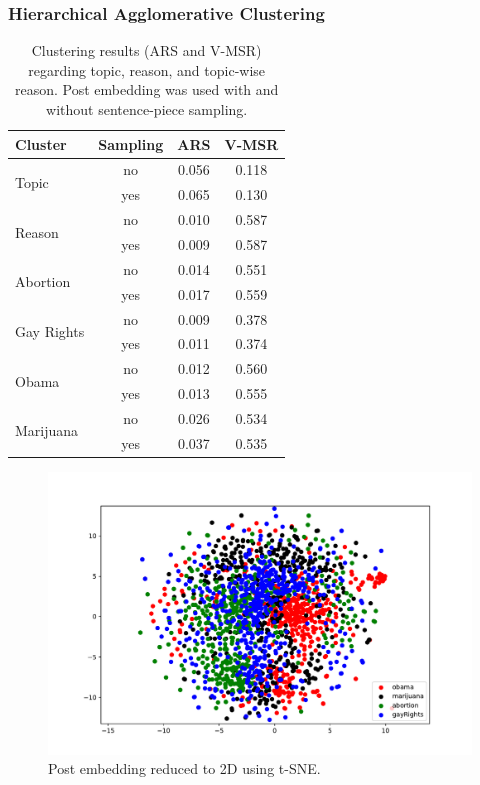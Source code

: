 \documentclass[11pt]{article}
\begin{document}
\subsubsection*{Hierarchical Agglomerative Clustering}

\begin{table}
  \centering
  \begin{tabular}{lccc}
    \toprule
    Cluster & Sampling & ARS & V-MSR \\
    \midrule
    \multirow{2}{*}{Topic} & no & 0.056 &  0.118 \\
    & yes & 0.065 & 0.130 \\[8pt]
    \multirow{2}{*}{Reason} & no & 0.010 &  0.587 \\
    & yes & 0.009 & 0.587 \\[8pt]
    \multirow{2}{*}{Abortion} & no  & 0.014 &  0.551 \\
    & yes & 0.017 & 0.559 \\[8pt]
    \multirow{2}{*}{Gay Rights} & no  & 0.009 &  0.378 \\
    & yes & 0.011 & 0.374 \\
    \multirow{2}{*}{Obama} & no & 0.012 &  0.560 \\
    & yes & 0.013 & 0.555 \\[8pt]
    \multirow{2}{*}{Marijuana} & no  & 0.026 &  0.534 \\
    & yes & 0.037 & 0.535 \\[8pt]
    \bottomrule
  \end{tabular}
  \caption{\label{table:2}Clustering results (ARS and V-MSR) regarding topic, reason, and topic-wise reason.
    Post embedding was used with and without sentence-piece sampling.}
\end{table}

\begin{figure}
  \centering
  \includegraphics[width=\textwidth]{tsne.pdf}
  \caption{\label{figure:tsne}Post embedding reduced to 2D using t-SNE.}
\end{figure}
\end{document}
